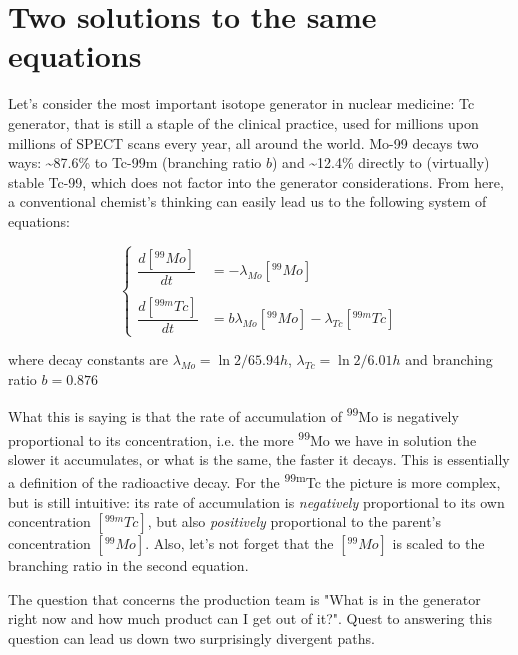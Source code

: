 \section{Two solutions to the same equations}
\label{sec:two_solutions}

Let's consider the most important isotope generator in nuclear medicine: Tc generator, that is still a staple of the clinical practice, used for millions upon millions of SPECT scans every year, all around the world. Mo-99 decays two ways: \~{}87.6\% to Tc-99m (branching ratio $b$) and \~{}12.4\% directly to (virtually) stable Tc-99, which does not factor into the generator considerations. From here, a conventional chemist's thinking can easily lead us to the following system of equations:

\begin{equation}
	\begin{cases}
		\dfrac{d[^{99}Mo]}{dt} &= -\lambda_{Mo}[^{99}Mo] \\ \\
		\dfrac{d[^{99m}Tc]}{dt} &= b\lambda_{Mo}[^{99}Mo]-\lambda_{Tc}[^{99m}Tc]
	\end{cases}
	\label{eq:original_system}
\end{equation}

where decay constants are $\lambda_{Mo} = \ln2/65.94h$, $\lambda_{Tc} = \ln2/6.01h$ and branching ratio $b = 0.876$

What this is saying is that the rate of accumulation of \textsuperscript{99}Mo is negatively proportional to its concentration, i.e. the more \textsuperscript{99}Mo we have in solution the slower it accumulates, or what is the same, the faster it decays. This is essentially a definition of the radioactive decay. For the \textsuperscript{99m}Tc the picture is more complex, but is still intuitive: its rate of accumulation is \textit{negatively} proportional to its own concentration $[{^{99m}Tc}]$, but also \textit{positively} proportional to the parent's concentration $[^{99}Mo]$. Also, let's not forget that the $[^{99}Mo]$ is scaled to the branching ratio in the second equation.

The question that concerns the production team is "What is in the generator right now and how much product can I get out of it?". Quest to answering this question can lead us down two surprisingly divergent paths.

